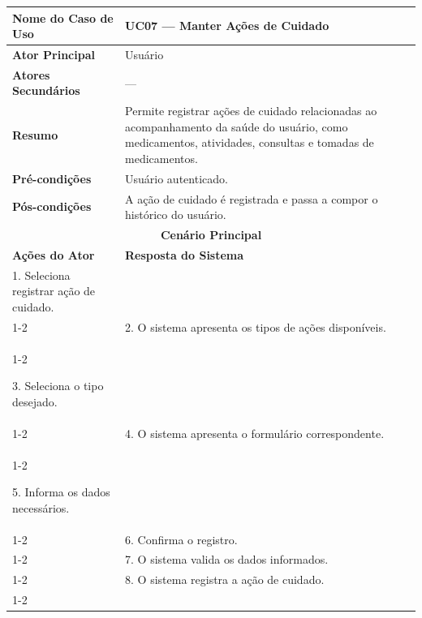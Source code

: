 
\begin{longtable}{| p{} | p{} |}
\hline

\textbf{Nome do Caso de Uso} &
UC07 --- Manter Ações de Cuidado \\
\hline

\textbf{Ator Principal} &
Usuário \\
\hline

\textbf{Atores Secundários} &
--- \\
\hline

\textbf{Resumo} &
Permite registrar ações de cuidado relacionadas ao acompanhamento da
saúde do usuário, como medicamentos, atividades, consultas e tomadas
de medicamentos. \\
\hline

\textbf{Pré-condições} &
Usuário autenticado. \\
\hline

\textbf{Pós-condições} &
A ação de cuidado é registrada e passa a compor o histórico do usuário. \\
\hline

\multicolumn{2}{|c|}{\textbf{Cenário Principal}}\\
\hline

\textbf{Ações do Ator} &
\textbf{Resposta do Sistema} \\
\hline

1. Seleciona registrar ação de cuidado. & \\
\cline{1-2}

&

2. O sistema apresenta os tipos de ações disponíveis. \\

\cline{1-2}

3. Seleciona o tipo desejado. & \\
\cline{1-2}

&
4. O sistema apresenta o formulário correspondente. \\
\cline{1-2}

5. Informa os dados necessários. & \\
\cline{1-2}

&
6. Confirma o registro. \\
\cline{1-2}

&
7. O sistema valida os dados informados. \\
\cline{1-2}

&
8. O sistema registra a ação de cuidado. \\
\cline{1-2}


\end{longtable}
